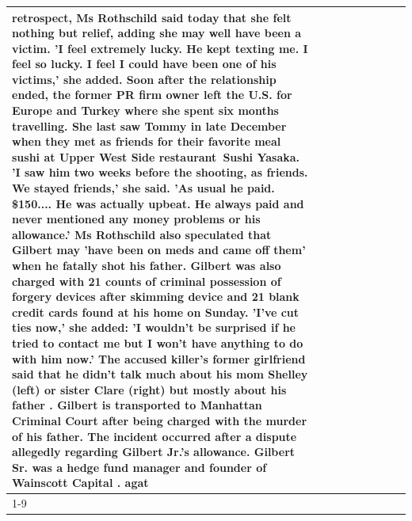 \begin{table}[H]
\begin{tabular}{lllrlllll}
retrospect, Ms Rothschild said today that she felt nothing but relief, adding she may well have been a victim. 'I feel extremely lucky. He kept texting me. I feel so lucky. I feel I could have been one of his victims,' she added. Soon after the relationship ended, the former PR firm owner left the U.S. for Europe and Turkey where she spent six months  travelling. She last saw Tommy in late December when they met as friends for their favorite meal sushi at Upper West Side restaurant Sushi Yasaka. 'I saw him two weeks before the shooting, as friends. We stayed friends,' she said. 'As usual he paid. \$150.... He was actually upbeat. He always paid and never mentioned any money problems or his allowance.' Ms Rothschild also speculated that Gilbert may 'have been on meds and came off them' when he fatally shot his father. Gilbert was also charged with 21 counts of criminal possession of forgery devices after skimming device and 21 blank credit cards found at his home on Sunday. 'I've cut ties now,' she added: 'I wouldn’t be surprised if he tried to contact me but I won’t have anything to do with him now.' The accused killer's former girlfriend said that he didn't talk much about his mom Shelley (left) or sister Clare (right) but mostly about his father . Gilbert is transported to Manhattan Criminal Court  after being charged with the murder of his father. The incident occurred after a dispute allegedly regarding Gilbert Jr.'s allowance. Gilbert Sr. was a hedge fund manager and founder of Wainscott Capital . agat \\
\cline{1-9} \cline{2-9}

\end{tabular}
\end{table}
